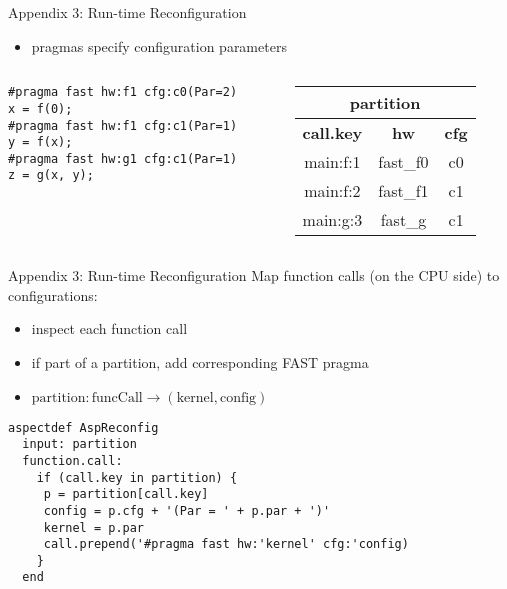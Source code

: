 \begin{frame}[fragile]{Appendix 3: Run-time Reconfiguration}
  \begin{itemize}
    \setlength{\itemsep}{8pt}
  \item pragmas specify configuration parameters
\end{itemize}
    \begin{columns}
      \begin{column}{.7\textwidth}
        \begin{center}
          \begin{lstlisting}[style=laranobox]
#pragma fast hw:f1 cfg:c0(Par=2)
x = f(0);
#pragma fast hw:f1 cfg:c1(Par=1)
y = f(x);
#pragma fast hw:g1 cfg:c1(Par=1)
z = g(x, y);
          \end{lstlisting}
        \end{center}
      \end{column}
      \begin{column}{.3\textwidth}
        {\footnotesize
          \begin{table}[!h]
            \renewcommand{\arraystretch}{1.3}
            \hspace{-2cm}
            \begin{tabular}{c|c|c}
              \multicolumn{3}{c}{\bf{partition}} \\
              \hline
              \bf{call.key} & \bf{hw} & \bf{cfg}  \\
              \hline
              main:f:1 & fast\_f0 & c0 \\
              main:f:2 & fast\_f1 & c1 \\
              main:g:3 & fast\_g & c1 \\
            \end{tabular}
          \end{table}
        }
      \end{column}
    \end{columns}

\end{frame}

\begin{frame}[fragile]{Appendix 3: Run-time Reconfiguration}
  Map function calls (on the CPU side) to configurations:
  \begin{itemize}
  \item inspect each function call
  \item if part of a partition, add corresponding FAST pragma
  \item $ \text{partition} : \text{funcCall} \rightarrow (\text{kernel}, \text{config}) $
  \end{itemize}

  \begin{lstlisting}[style=lara]
  aspectdef AspReconfig
  input: partition
  function.call:
    if (call.key in partition) {
     p = partition[call.key]
     config = p.cfg + '(Par = ' + p.par + ')'
     kernel = p.par
     call.prepend('#pragma fast hw:'kernel' cfg:'config)
    }
  end
  \end{lstlisting}
\end{frame}


